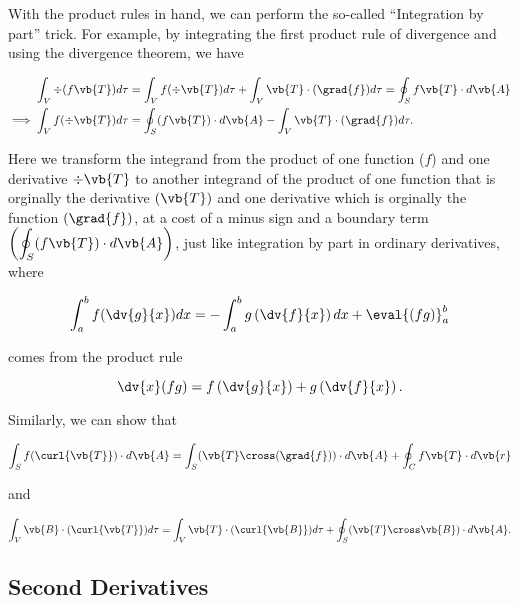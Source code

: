 \documentclass[english,a4paper,12pt]{report}
\begin{document}
With the product rules in hand, we can perform the so-called ``Integration by part'' trick. For example, by integrating the first product rule of divergence and using the divergence theorem, we have
	
\begin{equation} 
	\begin{aligned}
	\int_{V} \div{(f\vb{T})} d\tau &= \int_{V} f(\div{\vb{T}}) d\tau + \int_{V} \vb{T} \cdot (\grad{f}) d\tau = \oint_{S} f\vb{T} \cdot d\vb{A} \\
	\implies \int_{V} f(\div{\vb{T}}) d\tau &= \oint_{S} (f\vb{T}) \cdot d\vb{A} - \int_{V} \vb{T} \cdot (\grad{f}) d\tau. 
	\end{aligned}
\end{equation}
	
Here we transform the integrand from the product of one function (\(f\)) and one derivative \(\div{\vb{T}}\) to another integrand of the product of one function that is orginally the derivative \((\vb{T})\) and one derivative which is orginally the function \((\grad{f})\), at a cost of a minus sign and a boundary term \(\displaystyle \left(\oint_{S} (f\vb{T}) \cdot d\vb{A}\right)\), just like integration by part in ordinary derivatives, where
	
\begin{equation} 
	\int_{a}^{b} f(\dv{g}{x})dx = -\int_{a}^{b} g\left(\dv{f}{x}\right)dx + \eval{\left(fg\right)}_a^b 
\end{equation}
	
comes from the product rule
	
\begin{equation} 
	\dv{x}(fg) = f\left(\dv{g}{x}\right) + g\left(\dv{f}{x}\right). 
\end{equation}

Similarly, we can show that 
	
\begin{equation} 
	\int_{S} f(\curl{\vb{T}}) \cdot d\vb{A} = \int_{S} (\vb{T} \cross (\grad{f})) \cdot d\vb{A} + \oint_{C} f\vb{T} \cdot d\vb{r} 
\end{equation}
	
and

\begin{equation} 
	\int_{V} \vb{B} \cdot (\curl{\vb{T}}) d\tau = \int_{V} \vb{T} \cdot (\curl{\vb{B}}) d\tau + \oint_{S} (\vb{T} \cross \vb{B}) \cdot d\vb{A}. 
\end{equation}
	
\subsection{Second Derivatives}
	
\end{document}
